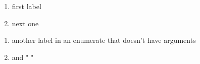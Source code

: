 \documentclass{article}
\begin{document}
\begin{enumerate}[label=(\arabic*),topsep=3em, itemsep =3pt]
\item first label
\item next one
\end{enumerate}

\begin{enumerate}
\item another label in an enumerate that doesn't have arguments
\item and " "
\end{enumerate}
\end{document}
